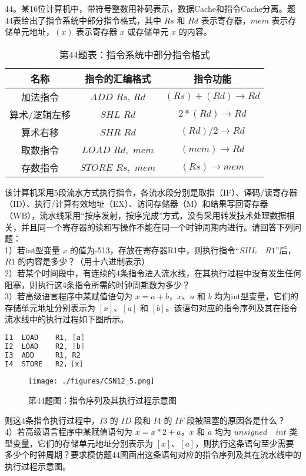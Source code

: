 44。某16位计算机中，带符号整数用补码表示，数据Cache和指令Cache分离。题44表给出了指令系统中部分指令格式，其中 $Rs$ 和 $Rd$ 表示寄存器，$mem$ 表示存储单元地址，$(x)$ 表示寄存器 $x$ 或存储单元 $x$ 的内容。\\
\begin{table}[ht]
\centering
\caption{第44题表：指令系统中部分指令格式}\label{CSN12_tab2}
\begin{tabular}{|c|c|c|}
\hline
名称 & 指令的汇编格式 & 指令功能 \\
\hline
加法指令 & $ADD$ $Rs$, $Rd$ & $(Rs)+(Rd) \rightarrow Rd$ \\
\hline
算术/逻辑左移 & $SHL$ $Rd$ & $2*(Rd) \rightarrow Rd$ \\
\hline
算术右移 & $SHR$ $Rd$ & $(Rd)/2 \rightarrow Rd$ \\
\hline
取数指令& $LOAD$ $Rd,$ $mem$ & $(mem) \rightarrow Rd$ \\
\hline
存数指令 & $STORE$ $Rs,$ $mem$ & $(Rs) \rightarrow mem$ \\
\hline
\end{tabular}
\end{table}
该计算机采用5段流水方式执行指令，各流水段分别是取指（IF）、译码/读寄存器（ID）、执行/计算有效地址（EX）、访问存储器（M）和结果写回寄存器（WB），流水线采用“按序发射，按序完成”方式，没有采用转发技术处理数据相关，并且同一个寄存器的读和写操作不能在同一个时钟周期内进行。请回答下列问题：\\
1）若int型变量 $x$ 的值为-513，存放在寄存器R1中，则执行指令“$SHL \quad R1$”后，$R1$ 的内容是多少？（用十六进制表示）\\
2）若某个时间段中，有连续的4条指令进入流水线，在其执行过程中没有发生任何阻塞，则执行这4条指令所需的时钟周期数为多少？\\
3）若高级语言程序中某赋值语句为 $x=a+b$，$x$、$a$ 和 $b$ 均为int型变量，它们的存储单元地址分别表示为 $[x]$、$[a]$ 和 $[b]$。该语句对应的指令序列及其在指令流水线中的执行过程如下图所示。\\
\begin{lstlisting}[language=cpp]
I1  LOAD    R1, [a]
I2  LOAD    R2, [b]
I3  ADD     R1, R2
I4  STORE   R2，[x]
\end{lstlisting}
\begin{figure}[ht]
\centering
\texttt{[image: ./figures/CSN12\_5.png]}
\caption{第44题图：指令序列及其执行过程示意图} \label{CSN12_fig5}
\end{figure}
则这4条指令执行过程中，$I3$ 的 $ID$ 段和 $I4$ 的 $IF$ 段被阻塞的原因各是什么？\\
4）若高级语言程序中某赋值语句为 $x=x*2+a$，$x$ 和 $a$ 均为 $unsigned \quad int$ 类型变量，它们的存储单元地址分别表示为 $[x]$、$[a]$，则执行这条语句至少需要多少个时钟周期？要求模仿题44图画出这条语句对应的指令序列及其在流水线中的执行过程示意图。

